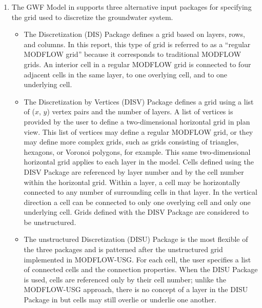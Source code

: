 \begin{enumerate}

\item The GWF Model in \mf supports three alternative input packages for specifying the grid used to discretize the groundwater system.  
\begin{itemize}
\item The Discretization (DIS) Package defines a grid based on layers, rows, and columns.  In this report, this type of grid is referred to as a ``regular MODFLOW grid'' because it corresponds to traditional MODFLOW grids.  An interior cell in a regular MODFLOW grid is connected to four adjacent cells in the same layer, to one overlying cell, and to one underlying cell.
\item The Discretization by Vertices (DISV) Package defines a grid using a list of ($x$, $y$) vertex pairs and the number of layers.  A list of vertices is provided by the user to define a two-dimensional horizontal grid in plan view.  This list of vertices may define a regular MODFLOW grid, or they may define more complex grids, such as grids consisting of triangles, hexagons, or Voronoi polygons, for example.  This same two-dimensional horizontal grid applies to each layer in the model.  Cells defined using the DISV Package are referenced by layer number and by the cell number within the horizontal grid.  Within a layer, a cell may be horizontally connected to any number of surrounding cells in that layer.  In the vertical direction a cell can be connected to only one overlying cell and only one underlying cell.  Grids defined with the DISV Package are considered to be unstructured.
\item The unstructured Discretization (DISU) Package is the most flexible of the three packages and is patterned after the unstructured grid implemented in MODFLOW-USG.  For each cell, the user specifies a list of connected cells and the connection properties.  When the DISU Package is used, cells are referenced only by their cell number; unlike the MODFLOW-USG approach, there is no concept of a layer in the DISU Package in \mfcomma but cells may still overlie or underlie one another.  
\end{itemize}


\end{enumerate}
